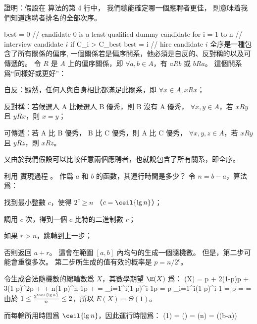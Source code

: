 \startsection[
  title={The hiring problem},
]

\startEXERCISE
證明：假設在  算法的第 4 行中，
我們總能確定哪一個應聘者更佳，
則意味着我們知道應聘者排名的全部次序。

\startCLRSCODE
best = 0	// candidate 0 is a least-qualified dummy candidate
for i = 1 to n
	// interview candidate $i$
	if C_i > C_{best}
		best = i
		// hire candidate $i$
\stopCLRSCODE
\stopEXERCISE
\startANSWER
全序是一種包含了所有關係的偏序,
一個關係若是偏序關系，他必須是自反的、反對稱的以及可傳遞的。
令 $R$ 是 $A$ 上的偏序關係，即 $\forall a,b \in A$，有 $a R b$ 或 $b R a$。
這個關系爲“同樣好或更好”：
\startigBase[1]
\item 自反：顯然，任何人與自身相比都滿足此關系，即 $\forall x\in A, x R x$；
\item 反對稱：若候選人 A 比候選人 B 優秀，則 B 沒有 A 優秀， $\forall x,y\in A$，若 $xRy$ 且 $yRx$，則 $x=y$；
\item 可傳遞：若 A 比 B 優秀， B 比 C 優秀，則 A 比 C 優秀， $\forall x,y,z\in A$，若 $xRy$ 且 $yRz$，則 $xRz$。
\stopigBase

又由於我們假設可以比較任意兩個應聘者，也就說包含了所有關系，即全序。
\stopANSWER

\startEXERCISE \DIFFICULT
利用  實現過程 。
作爲 $a$ 和 $b$ 的函數，其運行時間是多少？
\stopEXERCISE
\startANSWER
令 $n=b-a$，算法爲：
\startigBase[n]
\item 找到最小整數 $c$，使得 $2^c\ge n$ （$c=\ceil{\lg{n}}$）；
\item 調用  $c$ 次，得到一個 $c$ 比特的二進制數 $r$；
\item 如果 $r>n$，跳轉到上一步；
\item 否則返回 $a+r$。
\stopigBase
這會在範圍 $[a, b]$ 內均勻的生成一個隨機數。
但是，第二步可能會重復多次。
第二步所生成的值有效的概率是 $p=n/2^c$。

令生成合法隨機數的總輪數爲 $X$，其數學期望 $\E(X)$ 爲：
\startformula\startmathalignment
\NC \E(X)
    \NC = p + 2(1-p)p + 3(1-p)^2p + \cdots + n(1-p)^{n-1}p + \cdots \NR
\NC \NC = \sum_{i=1}^{\infty}i(1-p)^{i-1}p \NR
\NC \NC = p \sum_{i=1}^{\infty}i(1-p)^{i-1} \NR
\NC \NC = p  \NR
\NC \NC =  \NR
\NC \NC =  \NR
\stopmathalignment\stopformula
由於 $1 \le \frac{2^{\ceil{\lg n}}}{n} \le 2$，所以 $E(X)=\Theta(1)$。

而每輪所用時間爲 $\ceil{\lg n}$，因此運行時間爲：
\startformula
{}\Theta(1) = \Theta() = \Theta(\lg n) = \Theta(\lg(b-a))
\stopformula
\stopANSWER

